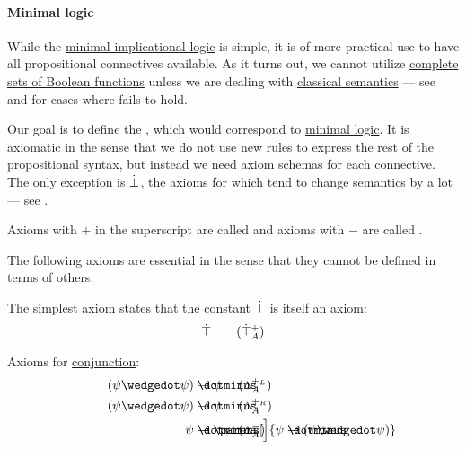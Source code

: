 \paragraph{Minimal logic}

\begin{definition}\label{def:minimal_implicational_logic}
  While the \hyperref[def:minimal_implication_logic]{minimal implicational logic} is simple, it is of more practical use to have all propositional connectives available. As it turns out, we cannot utilize \hyperref[def:boolean_closure/complete]{complete sets of Boolean functions} unless we are dealing with \hyperref[def:propositional_entailment]{classical semantics} --- see  and  for cases where  fails to hold.

  Our goal is to define the , which would correspond to \hyperref[def:minimal_logic]{minimal logic}. It is axiomatic in the sense that we do not use new rules to express the rest of the propositional syntax, but instead we need axiom schemas for each connective. The only exception is \hyperref[def:propositional_alphabet/constants/verum]{\( \dot\bot \)}, the axioms for which tend to change semantics by a lot --- see .

  Axioms with \( + \) in the superscript are called  and axioms with \( - \) are called .

  The following axioms are essential in the sense that they cannot be defined in terms of others:
  \begin{thmenum}[series=def:minimal_implicational_logic]
     The simplest axiom states that the constant \hyperref[def:propositional_alphabet/constants/verum]{\( \dot\top \)} is itself an axiom:
    \begin{equation}\label{eq:def:minimal_implicational_logic/top/intro}
      \syntop \tag{\( \syntop_A^+ \)}
    \end{equation}

     Axioms for \hyperref[def:propositional_alphabet/connectives/conjunction]{conjunction}:
    \begin{align}
      \mathllap{ (\psi \synwedge \psi) } &\synimplies \mathrlap{ \psi } \tag{\( \wedge_A^{+_L} \)} \label{eq:def:minimal_implicational_logic/and/elim_left} \\
      \mathllap{ (\psi \synwedge \psi) } &\synimplies \mathrlap{ \psi } \tag{\( \wedge_A^{+_R} \)} \label{eq:def:minimal_implicational_logic/and/elim_right} \\
      \mathllap{ \psi }               &\synimplies \mathrlap{ \parens[\Big]{ \psi \synimplies (\psi \synwedge \psi) } } \tag{\( \wedge_A^{-} \)} \label{eq:def:minimal_implicational_logic/and/intro}
    \end{align}


\end{thmenum}
\end{definition}

